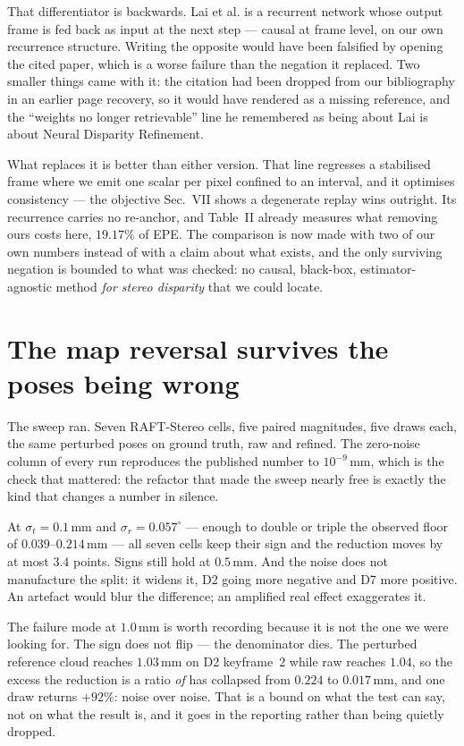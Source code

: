 \documentclass[11pt,a4paper]{article}
\begin{document}
That differentiator is backwards. Lai et al. is a recurrent network whose
output frame is fed back as input at the next step --- causal at frame level,
on our own recurrence structure. Writing the opposite would have been falsified
by opening the cited paper, which is a worse failure than the negation it
replaced. Two smaller things came with it: the citation had been dropped from
our bibliography in an earlier page recovery, so it would have rendered as a
missing reference, and the ``weights no longer retrievable'' line he
remembered as being about Lai is about Neural Disparity Refinement.

What replaces it is better than either version. That line regresses a
stabilised frame where we emit one scalar per pixel confined to an interval,
and it optimises consistency --- the objective Sec.~VII shows a degenerate
replay wins outright. Its recurrence carries no re-anchor, and Table~II already
measures what removing ours costs here, $19.17\%$ of EPE. The comparison is now
made with two of our own numbers instead of with a claim about what exists, and
the only surviving negation is bounded to what was checked: no causal,
black-box, estimator-agnostic method \emph{for stereo disparity} that we could
locate.



\section*{The map reversal survives the poses being wrong}

The sweep ran. Seven RAFT-Stereo cells, five paired magnitudes, five draws
each, the same perturbed poses on ground truth, raw and refined. The zero-noise
column of every run reproduces the published number to $10^{-9}$\,mm, which is
the check that mattered: the refactor that made the sweep nearly free is
exactly the kind that changes a number in silence.

At $\sigma_t=0.1$\,mm and $\sigma_r=0.057^\circ$ --- enough to double or
triple the observed floor of $0.039$--$0.214$\,mm --- all seven cells keep
their sign and the reduction moves by at most $3.4$ points. Signs still hold at
$0.5$\,mm. And the noise does not manufacture the split: it widens it, D2
going more negative and D7 more positive. An artefact would blur the
difference; an amplified real effect exaggerates it.

The failure mode at $1.0$\,mm is worth recording because it is not the one we
were looking for. The sign does not flip --- the denominator dies. The
perturbed reference cloud reaches $1.03$\,mm on D2 keyframe~$2$ while raw
reaches $1.04$, so the excess the reduction is a ratio \emph{of} has collapsed
from $0.224$ to $0.017$\,mm, and one draw returns $+92\%$: noise over noise.
That is a bound on what the test can say, not on what the result is, and it
goes in the reporting rather than being quietly dropped.
\end{document}
